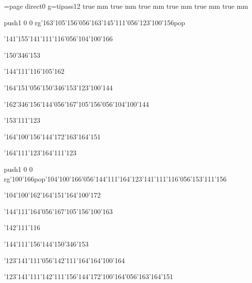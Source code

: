 \chardef\match=\pdfcolorstackinit page direct{0 g}\nopagenumbers\font\ipa=tipass12 true mm true mm true mm true mm true mm true mm
\null\vfill\ipa\centerline{\enskip\pdfcolorstack\match push{1 0 0 rg}\char'163\char'105\char'156\char'056\char'163\char'145\char'111\char'056\char'123\char'100\char'156\pdfcolorstack\match pop{}}\medskip\centerline{\enskip\enskip\enskip\enskip\char'141\enskip\enskip\enskip\enskip\enskip\enskip\enskip\enskip\char'155\char'141\char'111\char'116\char'056\char'104\char'100\char'166}\medskip\centerline{\enskip\enskip\enskip\enskip\enskip\enskip\enskip\enskip\enskip\enskip\enskip\enskip\enskip\enskip\char'150\char'346\char'153}\medskip\centerline{\enskip\char'144\char'111\char'116\enskip\enskip\enskip\enskip\enskip\char'105\char'162\enskip\enskip\enskip\enskip\enskip\enskip}\medskip\centerline{\enskip\enskip\enskip\enskip\enskip\char'164\char'151\char'056\char'150\char'346\char'153\enskip\char'123\char'100\char'144}\medskip\centerline{\enskip\enskip\enskip\enskip\enskip\char'162\char'346\char'156\char'144\char'056\char'167\char'105\char'156\char'056\char'104\char'100\char'144}\medskip\centerline{\enskip\enskip\enskip\enskip\enskip\enskip\enskip\enskip\enskip\enskip\enskip\char'153\char'111\char'123}\medskip\centerline{\enskip\enskip\enskip\enskip\enskip\char'164\char'100\char'156\char'144\char'172\enskip\enskip\enskip\enskip\enskip\enskip\char'163\char'164\char'151}\medskip\vfill\footline{\hfil\tt\folio\hfil}\eject
\null\vfill\ipa\centerline{\enskip\char'164\char'111\char'123\enskip\enskip\enskip\enskip\char'164\char'111\char'123}\medskip\centerline{\enskip\pdfcolorstack\match push{1 0 0 rg}\char'100\char'166\pdfcolorstack\match pop{}\enskip\enskip\enskip\char'104\char'100\char'166\char'056\char'144\char'111\char'164\enskip\char'123\char'141\char'111\char'116\char'056\char'153\char'111\char'156}\medskip\centerline{\enskip\char'104\char'100\char'162\enskip\enskip\enskip\enskip\char'164\char'151\enskip\enskip\enskip\enskip\char'164\char'100\char'172}\medskip\centerline{\enskip\char'144\char'111\char'164\char'056\char'167\char'105\char'156\enskip\char'100\char'163\enskip\enskip\enskip\enskip\enskip\enskip}\medskip\centerline{\enskip\enskip\enskip\enskip\enskip\enskip\enskip\enskip\enskip\enskip\enskip\char'142\char'111\char'116}\medskip\centerline{\enskip\enskip\enskip\enskip\enskip\char'144\char'111\char'156\char'144\enskip\enskip\enskip\enskip\char'150\char'346\char'153}\medskip\centerline{\enskip\enskip\enskip\enskip\char'123\char'141\char'111\char'056\char'142\char'111\char'164\enskip\char'164\char'100\char'164}\medskip\centerline{\enskip\char'123\char'141\char'111\enskip\char'142\char'111\char'156\char'144\char'172\enskip\enskip\enskip\enskip\char'100\char'164\char'056\char'163\char'164\char'151}\medskip\vfill\footline{\hfil\tt\folio\hfil}\eject
